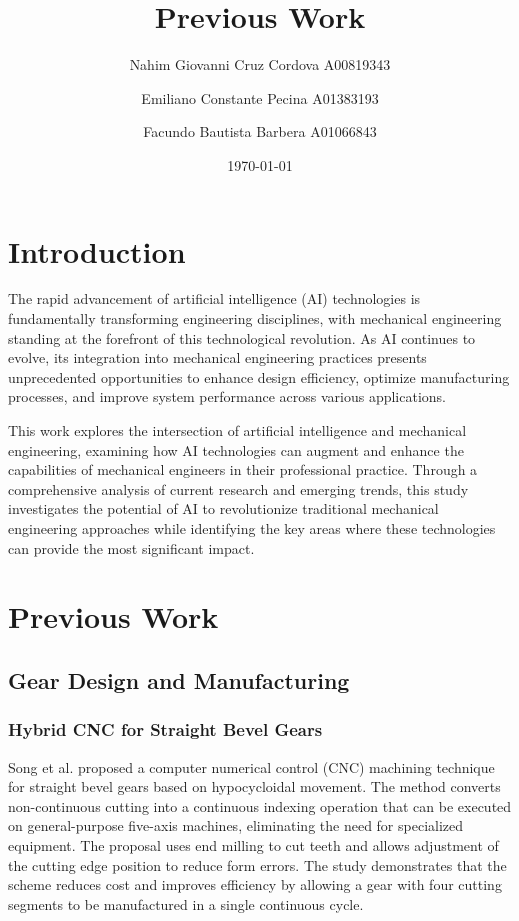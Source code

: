 \documentclass{article}
\title{Previous Work}
\author{
    Nahim Giovanni Cruz Cordova A00819343 \and
    Emiliano Constante Pecina A01383193 \and
    Facundo Bautista Barbera A01066843
}
\date{\today}
\begin{document}
\maketitle

\section*{Introduction}

The rapid advancement of artificial intelligence (AI) technologies is fundamentally transforming engineering disciplines, with mechanical engineering standing at the forefront of this technological revolution. As AI continues to evolve, its integration into mechanical engineering practices presents unprecedented opportunities to enhance design efficiency, optimize manufacturing processes, and improve system performance across various applications.

This work explores the intersection of artificial intelligence and mechanical engineering, examining how AI technologies can augment and enhance the capabilities of mechanical engineers in their professional practice. Through a comprehensive analysis of current research and emerging trends, this study investigates the potential of AI to revolutionize traditional mechanical engineering approaches while identifying the key areas where these technologies can provide the most significant impact.

\section*{Previous Work}

\subsection*{Gear Design and Manufacturing}

\subsubsection*{Hybrid CNC for Straight Bevel Gears}
Song et al. \cite{song2025cnc} proposed a computer numerical control (CNC) machining technique for straight bevel gears based on hypocycloidal movement.
The method converts non-continuous cutting into a continuous indexing operation that can be executed on general-purpose five-axis machines, eliminating the need for specialized equipment.
The proposal uses end milling to cut teeth and allows adjustment of the cutting edge position to reduce form errors.
The study demonstrates that the scheme reduces cost and improves efficiency by allowing a gear with four cutting segments to be manufactured in a single continuous cycle.
\end{document}
